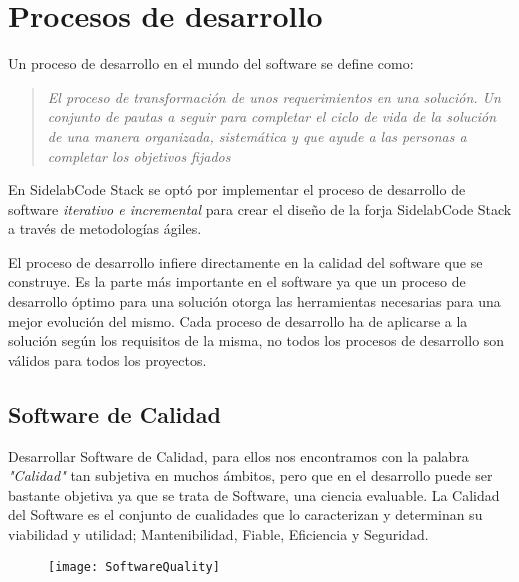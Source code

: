 \chapter{Procesos de desarrollo}
\label{chap:procesos-desarrollo}

\par Un proceso de desarrollo en el mundo del software se define como:

\begin{quote}
\emph{El proceso de transformación de unos requerimientos en una solución. Un conjunto de pautas a seguir para completar el ciclo de vida de la solución de una manera organizada, sistemática y que ayude a las personas a completar los objetivos fijados}
\end{quote}

\par En SidelabCode Stack se optó por implementar el proceso de desarrollo de software \emph{iterativo e incremental} para crear el dise\~no de la forja SidelabCode Stack a través de metodolog\'ias ágiles.

\par El proceso de desarrollo infiere directamente en la calidad del software que se construye. Es la parte más importante en el software ya que un proceso de desarrollo óptimo para una solución otorga las herramientas necesarias para una mejor evolución del mismo. Cada proceso de desarrollo ha de aplicarse a la solución según los requisitos de la misma, no todos los procesos de desarrollo son válidos para todos los proyectos.

\section{Software de Calidad}
\label{sec:software-calidad}

\par Desarrollar Software de Calidad, para ellos nos encontramos con la palabra \emph{"Calidad"} tan subjetiva en muchos ámbitos, pero que en el desarrollo puede ser bastante objetiva ya que se trata de Software, una ciencia evaluable. La Calidad del Software es el conjunto de cualidades que lo caracterizan y determinan su viabilidad y utilidad; Mantenibilidad, Fiable, Eficiencia y Seguridad.

\begin{figure}[H]
    \begin{center}	
        \texttt{[image: SoftwareQuality]}
        \label{fig:softwarequality}
    \end{center}
\end{figure}

